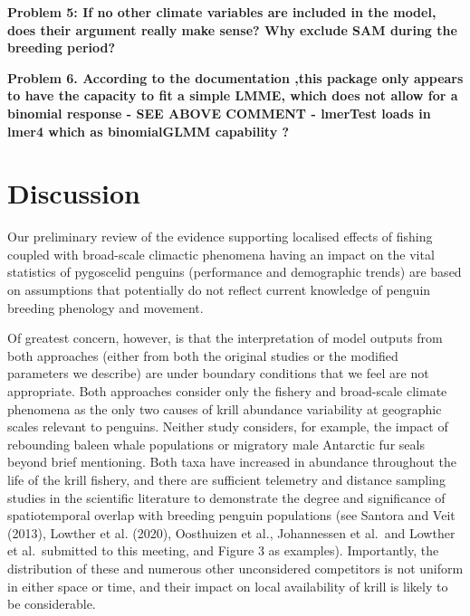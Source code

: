 \documentclass[]{elsarticle} %
\begin{document}
\textbf{Problem 5: If no other climate variables are included in the
model, does their argument really make sense? Why exclude SAM during the
breeding period?}

\textbf{Problem 6. According to the documentation ,this package only
appears to have the capacity to fit a simple LMME, which does not allow
for a binomial response - SEE ABOVE COMMENT - lmerTest loads in lmer4
which as binomialGLMM capability ?}

\hypertarget{discussion}{%
\section{Discussion}\label{discussion}}

Our preliminary review of the evidence supporting localised effects of
fishing coupled with broad-scale climactic phenomena having an impact on
the vital statistics of pygoscelid penguins (performance and demographic
trends) are based on assumptions that potentially do not reflect current
knowledge of penguin breeding phenology and movement.

Of greatest concern, however, is that the interpretation of model
outputs from both approaches (either from both the original studies or
the modified parameters we describe) are under boundary conditions that
we feel are not appropriate. Both approaches consider only the fishery
and broad-scale climate phenomena as the only two causes of krill
abundance variability at geographic scales relevant to penguins. Neither
study considers, for example, the impact of rebounding baleen whale
populations or migratory male Antarctic fur seals beyond brief
mentioning. Both taxa have increased in abundance throughout the life of
the krill fishery, and there are sufficient telemetry and distance
sampling studies in the scientific literature to demonstrate the degree
and significance of spatiotemporal overlap with breeding penguin
populations (see Santora and Veit (2013), Lowther et al. (2020),
Oosthuizen et al., Johannessen et al.~and Lowther et al.~submitted to
this meeting, and Figure 3 as examples). Importantly, the distribution
of these and numerous other unconsidered competitors is not uniform in
either space or time, and their impact on local availability of krill is
likely to be considerable.
\end{document}
